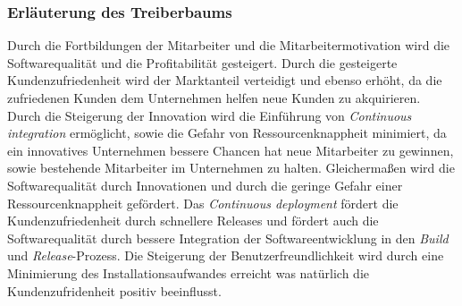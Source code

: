 \subsubsection{Erläuterung des Treiberbaums}
Durch die Fortbildungen der Mitarbeiter und die Mitarbeitermotivation wird die Softwarequalität und die Profitabilität gesteigert. Durch die gesteigerte Kundenzufriedenheit wird der Marktanteil verteidigt und ebenso erhöht, da die zufriedenen Kunden dem Unternehmen helfen neue Kunden zu akquirieren.
\newline
\newline
Durch die Steigerung der Innovation wird die Einführung von \emph{Continuous integration} ermöglicht, sowie die Gefahr von Ressourcenknappheit minimiert, da ein innovatives Unternehmen bessere Chancen hat neue Mitarbeiter zu gewinnen, sowie bestehende Mitarbeiter im Unternehmen zu halten. Gleichermaßen wird die Softwarequalität durch Innovationen und durch die geringe Gefahr einer Ressourcenknappheit gefördert.
\newline
\newline
Das \emph{Continuous deployment} fördert die Kundenzufriedenheit durch schnellere Releases und fördert auch die Softwarequalität durch bessere Integration der Softwareentwicklung in den \emph{Build} und \emph{Release}-Prozess. Die Steigerung der Benutzerfreundlichkeit wird durch eine Minimierung des Installationsaufwandes erreicht was natürlich die Kundenzufridenheit positiv beeinflusst.
